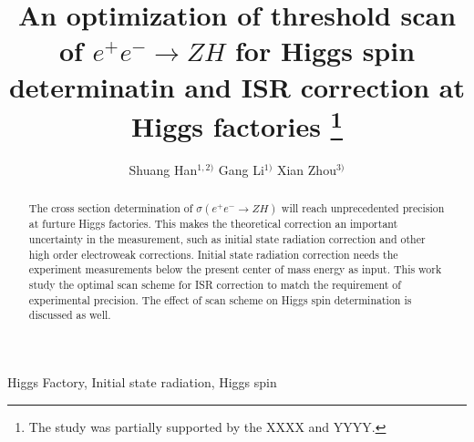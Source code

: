 \documentclass[a4paper,10pt,twoside]{cpc-hepnp}
\begin{document}


\title{ An  optimization of threshold scan of $e^+e^- \to ZH$  for Higgs spin determinatin and ISR correction at Higgs factories
\thanks{The study was partially supported by the XXXX and YYYY.}}

\author{%
          Shuang Han$^{1,2)}$%
\quad Gang Li$^{1)}$%
\quad Xian Zhou$^{3)}$%
}
\maketitle


\address{%
$^1$ Institute of High Energy Physics, Chinese Academy of Sciences, Beijing 100049, China\\
$^2$ Wuhan University, Hubei Province, China
}


\begin{abstract}
The cross section determination of $\sigma(e^+e^- \to ZH)$ will reach unprecedented  precision at furture Higgs factories. This makes the theoretical correction an important uncertainty in the measurement, such as initial state radiation correction and other high order electroweak corrections. Initial state radiation correction needs the experiment measurements below the present center of mass energy as input. This work study the optimal scan scheme for ISR correction to match the requirement of experimental precision. The effect of scan scheme on Higgs spin determination  is discussed as well.
\end{abstract}


\begin{keyword}
Higgs Factory, Initial state radiation, Higgs spin 
\end{keyword}

\begin{pacs}
\end{pacs}

%

\end{document}
